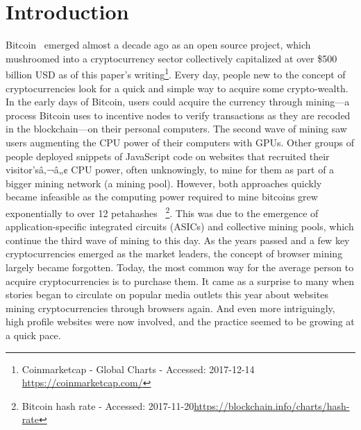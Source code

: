

\section{Introduction}

Bitcoin~\cite{nakamoto2008bitcoin} emerged almost a decade ago as an open source project, which mushroomed into a cryptocurrency sector collectively capitalized at over \$500 billion USD as of this paper's writing\footnote{Coinmarketcap - Global Charts - Accessed: 2017-12-14 \url{https://coinmarketcap.com/}}. Every day, people new to the concept of cryptocurrencies look for a quick and simple way to acquire some crypto-wealth. In the early days of Bitcoin, users could acquire the currency through mining---a process Bitcoin uses to incentive nodes to verify transactions as they are recoded in the blockchain---on their personal computers. The second wave of mining saw users augmenting the CPU power of their computers with GPUs. Other groups of people deployed snippets of JavaScript code on websites that recruited their visitor'sâ‚¬â„¢ CPU power, often unknowingly, to mine for them as part of a bigger mining network (\ie a mining pool). However, both approaches quickly became infeasible as the computing power required to mine bitcoins grew exponentially to over 12 petahashes ~\footnote{Bitcoin hash rate - Accessed: 2017-11-20\url{https://blockchain.info/charts/hash-rate}}. This was due to the emergence of application-specific integrated circuits (ASICs) and collective mining pools, which continue the third wave of mining to this day. As the years passed and a few key cryptocurrencies emerged as the market leaders, the concept of browser mining largely became forgotten. Today, the most common way for the average person to acquire cryptocurrencies is to purchase them. It came as a surprise to many when stories began to circulate on popular media outlets this year about websites mining cryptocurrencies through browsers again. And even more intriguingly, high profile websites were now involved, and the practice seemed to be growing at a quick pace.

